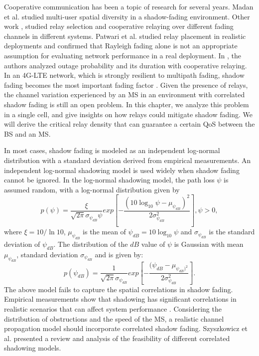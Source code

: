 \par Cooperative communication has been a topic of research for several years. Madan et al. \cite{madan2008energy} studied multi-user spatial diversity in a shadow-fading environment. Other work \cite{emamian2002multi,kasiri2008new,park2011opportunistic}, studied relay selection and cooperative relaying over different fading channels in different systems. Patwari et al. \cite{bletsas2006outage} studied relay placement in realistic deployments and confirmed that Rayleigh fading alone is not an appropriate assumption for evaluating network performance in a real deployment. In \cite{zlatanov2011average, kaltakis2009uplink}, the authors analyzed outage probability and its duration with cooperative relaying. In an 4G-LTE network, which is strongly resilient to multipath fading, shadow fading becomes the most important fading factor \cite{rappaport1996wireless}. Given the presence of relays, the channel variation experienced by an MS in an environment with correlated shadow fading is still an open problem. In this chapter, we analyze this problem in a single cell, and give insights on how relays could mitigate shadow fading. We will derive the critical relay density that can guarantee a certain QoS between the BS and an MS.
\par In most cases, shadow fading is modeled as an independent log-normal distribution \cite{goldsmith2005wireless} with a standard deviation derived from empirical measurements. An independent log-normal shadowing model is used widely when shadow fading cannot be ignored. In the log-normal shadowing model, the path loss $\psi$ is assumed random, with a log-normal distribution given by
\begin{equation}
p(\psi)=\frac{\xi}{\sqrt{2\pi}\sigma_{\psi_{dB}}\psi}exp[-\frac{(10\log_{10}\psi-\mu_{\psi_{dB}})^{2}}{2\sigma_{\psi_{dB}}^{2}}], \psi>0,
\end{equation}
where $\xi=10/\ln10$, $\mu_{\psi_{dB}}$ is the mean of $\psi_{dB}=10\log_{10}\psi$ and $\sigma_{\psi_{dB}}$ is the standard deviation of $\psi_{dB}$.
The distribution of the $dB$ value of $\psi$ is Gaussian with mean $\mu_{\psi_{dB}}$, standard deviation $\sigma_{\psi_{dB}}$ and is given by:
\begin{equation}
p(\psi_{dB})=\frac{1}{\sqrt{2\pi}\sigma_{\psi_{dB}}}exp[-\frac{(\psi_{dB}-\mu_{\psi_{dB})^2}}{2\sigma_{\psi_{dB}}^2}].
\end{equation}
The above model fails to capture the spatial correlations in shadow fading. Empirical measurements show that shadowing has significant correlations in realistic scenarios that can affect system performance \cite{graziano1978propagation}. Considering the distribution of obstructions and the speed of the MS, a realistic channel propagation model should incorporate correlated shadow fading.  Szyszkowicz et al. \cite{szyszkowicz2010feasibility} presented a review and analysis of the feasibility of different correlated shadowing models.
